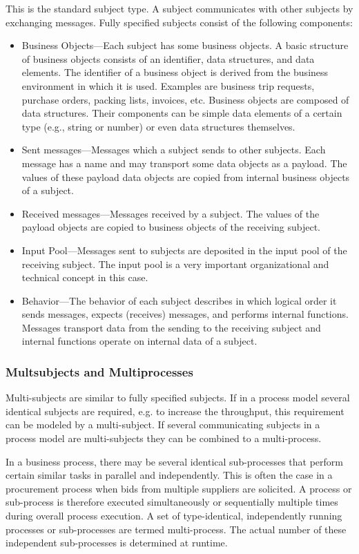 This is the standard subject type. A subject communicates with other subjects by exchanging messages. Fully specified subjects consist of the following components:

\begin{itemize}
	\item Business Objects---Each subject has some business objects. A basic structure of business objects consists of an identifier, data structures, and data elements. The identifier of a business object is derived from the business environment in which it is used. Examples are business trip requests, purchase orders, packing lists, invoices, etc. Business objects are composed of data structures. Their components can be simple data elements of a certain type (e.g., string or number) or even data structures themselves. 
	\item Sent messages---Messages which a subject sends to other subjects. Each message has a name and may transport some data objects as a payload. The values of these payload data objects are copied from internal business objects of a subject.
	\item Received messages---Messages received by a subject. The values of the payload objects are copied to business objects of the receiving subject.
	\item Input Pool---Messages sent to subjects are deposited in the input pool of the receiving subject. The input pool is a very important organizational and technical concept in this case.
	\item Behavior---The behavior of each subject describes in which logical order it sends messages, expects (receives) messages, and performs internal functions. Messages transport data from the sending to the receiving subject and internal functions operate on internal data of a subject. 
\end{itemize}


\subsubsection{Multsubjects and Multiprocesses}

Multi-subjects are similar to fully specified subjects. If in a process model several identical subjects are required, e.g. to increase the throughput, this requirement can be modeled by a multi-subject. If several communicating subjects in a process model are multi-subjects they can be combined to a multi-process.

In a business process, there may be several identical sub-processes that perform certain similar tasks in parallel and independently. This is often the case in a procurement process when bids from multiple suppliers are solicited. A process or sub-process is therefore executed simultaneously or sequentially multiple times during overall process execution. A set of type-identical, independently running processes or sub-processes are termed multi-process. The actual number of these independent sub-processes is determined at runtime.

